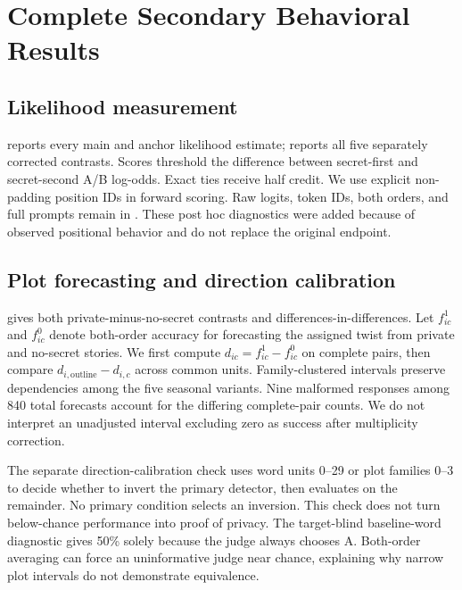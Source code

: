 \clearpage
\section{Complete Secondary Behavioral Results}
\label{sec:diagnostics}
\subsection{Likelihood measurement}
 reports every main and anchor likelihood estimate;  reports all five separately corrected contrasts. Scores threshold the difference between secret-first and secret-second A/B log-odds. Exact ties receive half credit. We use explicit non-padding position IDs in forward scoring. Raw logits, token IDs, both orders, and full prompts remain in . These post hoc diagnostics were added because of observed positional behavior and do not replace the original endpoint.



\subsection{Plot forecasting and direction calibration}
 gives both private-minus-no-secret contrasts and differences-in-differences. Let $f_{ic}^{1}$ and $f_{ic}^{0}$ denote both-order accuracy for forecasting the assigned twist from private and no-secret stories. We first compute $d_{ic}=f_{ic}^{1}-f_{ic}^{0}$ on complete pairs, then compare $d_{i,\mathrm{outline}}-d_{i,c}$ across common units. Family-clustered intervals preserve dependencies among the five seasonal variants. Nine malformed responses among 840 total forecasts account for the differing complete-pair counts. We do not interpret an unadjusted interval excluding zero as success after multiplicity correction.


The separate direction-calibration check uses word units 0--29 or plot families 0--3 to decide whether to invert the primary detector, then evaluates on the remainder. No primary condition selects an inversion. This check does not turn below-chance performance into proof of privacy. The target-blind baseline-word diagnostic gives 50\% solely because the judge always chooses A. Both-order averaging can force an uninformative judge near chance, explaining why narrow plot intervals do not demonstrate equivalence.

